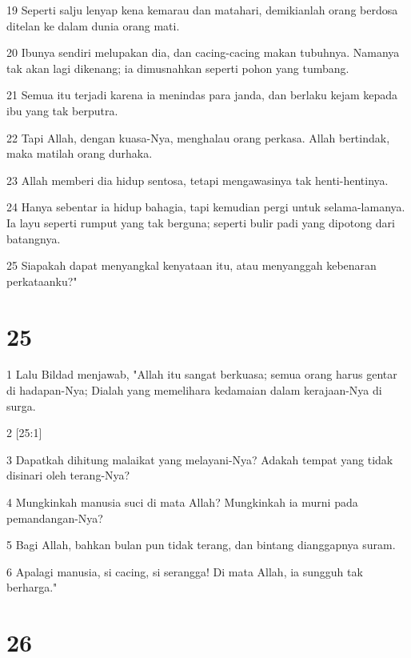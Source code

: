 \par 19 Seperti salju lenyap kena kemarau dan matahari, demikianlah orang berdosa ditelan ke dalam dunia orang mati.
\par 20 Ibunya sendiri melupakan dia, dan cacing-cacing makan tubuhnya. Namanya tak akan lagi dikenang; ia dimusnahkan seperti pohon yang tumbang.
\par 21 Semua itu terjadi karena ia menindas para janda, dan berlaku kejam kepada ibu yang tak berputra.
\par 22 Tapi Allah, dengan kuasa-Nya, menghalau orang perkasa. Allah bertindak, maka matilah orang durhaka.
\par 23 Allah memberi dia hidup sentosa, tetapi mengawasinya tak henti-hentinya.
\par 24 Hanya sebentar ia hidup bahagia, tapi kemudian pergi untuk selama-lamanya. Ia layu seperti rumput yang tak berguna; seperti bulir padi yang dipotong dari batangnya.
\par 25 Siapakah dapat menyangkal kenyataan itu, atau menyanggah kebenaran perkataanku?"

\chapter{25}

\par 1 Lalu Bildad menjawab, "Allah itu sangat berkuasa; semua orang harus gentar di hadapan-Nya; Dialah yang memelihara kedamaian dalam kerajaan-Nya di surga.
\par 2 [25:1]
\par 3 Dapatkah dihitung malaikat yang melayani-Nya? Adakah tempat yang tidak disinari oleh terang-Nya?
\par 4 Mungkinkah manusia suci di mata Allah? Mungkinkah ia murni pada pemandangan-Nya?
\par 5 Bagi Allah, bahkan bulan pun tidak terang, dan bintang dianggapnya suram.
\par 6 Apalagi manusia, si cacing, si serangga! Di mata Allah, ia sungguh tak berharga."

\chapter{26}

